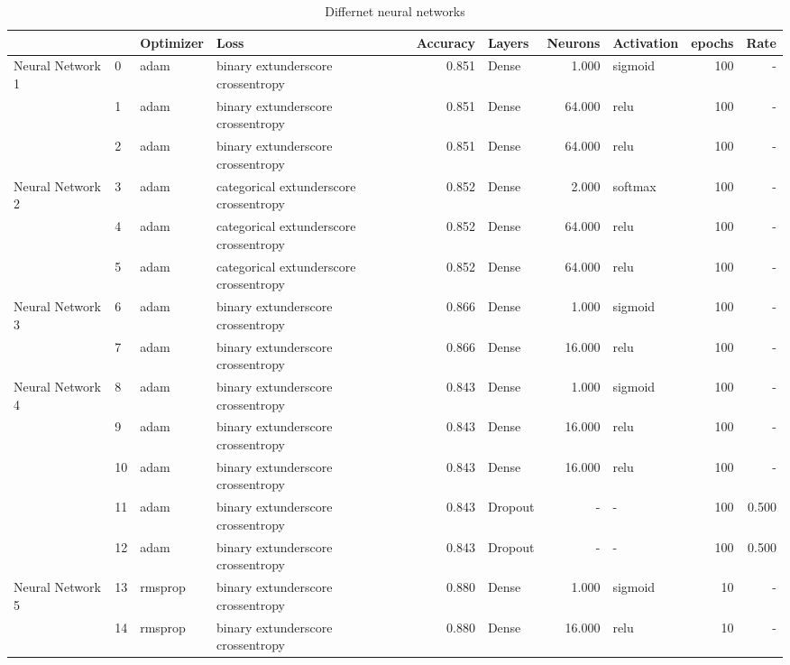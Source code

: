 \begin{table}[h!]
\caption{Differnet neural networks}
\label{tab:RawData}
\begin{tabular}{llllrlrlrr}
\toprule
 &  & Optimizer & Loss & Accuracy & Layers & Neurons & Activation & epochs & Rate \\
\midrule
\multirow[t]{3}{*}{Neural Network 1} & 0 & adam & binary	extunderscore crossentropy & 0.851 & Dense & 1.000 & sigmoid & 100 & - \\
 & 1 & adam & binary	extunderscore crossentropy & 0.851 & Dense & 64.000 & relu & 100 & - \\
 & 2 & adam & binary	extunderscore crossentropy & 0.851 & Dense & 64.000 & relu & 100 & - \\
\cline{1-10}
\multirow[t]{3}{*}{Neural Network 2} & 3 & adam & categorical	extunderscore crossentropy & 0.852 & Dense & 2.000 & softmax & 100 & - \\
 & 4 & adam & categorical	extunderscore crossentropy & 0.852 & Dense & 64.000 & relu & 100 & - \\
 & 5 & adam & categorical	extunderscore crossentropy & 0.852 & Dense & 64.000 & relu & 100 & - \\
\cline{1-10}
\multirow[t]{2}{*}{Neural Network 3} & 6 & adam & binary	extunderscore crossentropy & 0.866 & Dense & 1.000 & sigmoid & 100 & - \\
 & 7 & adam & binary	extunderscore crossentropy & 0.866 & Dense & 16.000 & relu & 100 & - \\
\cline{1-10}
\multirow[t]{5}{*}{Neural Network 4} & 8 & adam & binary	extunderscore crossentropy & 0.843 & Dense & 1.000 & sigmoid & 100 & - \\
 & 9 & adam & binary	extunderscore crossentropy & 0.843 & Dense & 16.000 & relu & 100 & - \\
 & 10 & adam & binary	extunderscore crossentropy & 0.843 & Dense & 16.000 & relu & 100 & - \\
 & 11 & adam & binary	extunderscore crossentropy & 0.843 & Dropout & - & - & 100 & 0.500 \\
 & 12 & adam & binary	extunderscore crossentropy & 0.843 & Dropout & - & - & 100 & 0.500 \\
\cline{1-10}
\multirow[t]{2}{*}{Neural Network 5} & 13 & rmsprop & binary	extunderscore crossentropy & 0.880 & Dense & 1.000 & sigmoid & 10 & - \\
 & 14 & rmsprop & binary	extunderscore crossentropy & 0.880 & Dense & 16.000 & relu & 10 & - \\
\cline{1-10}
\bottomrule
\end{tabular}
\end{table}
